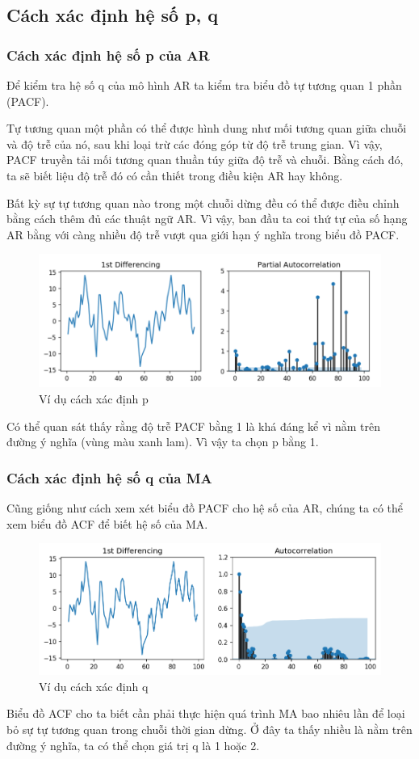  \subsection{Cách xác định hệ số p, q}
 \subsubsection{Cách xác định hệ số p của AR}
     Để kiểm tra hệ số q của mô hình AR ta kiểm tra biểu đồ tự tương quan 1 phần (PACF). \par
     Tự tương quan một phần có thể được hình dung như mối tương quan giữa chuỗi và độ trễ của nó, sau khi loại trừ các đóng góp từ độ trễ trung gian. Vì vậy, PACF truyền tải mối tương quan thuần túy giữa độ trễ và chuỗi. Bằng cách đó, ta sẽ biết liệu độ trễ đó có cần thiết trong điều kiện AR hay không.\par
     Bất kỳ sự tự tương quan nào trong một chuỗi dừng đều có thể được điều chỉnh bằng cách thêm đủ các thuật ngữ AR. Vì vậy, ban đầu ta coi thứ tự của số hạng AR bằng với càng nhiều độ trễ vượt qua giới hạn ý nghĩa trong biểu đồ PACF.\par
\begin{figure}[H]
    \centering
    \includegraphics[scale=0.8]{figures/PACF.png}
    \caption{Ví dụ cách xác định p}
\end{figure}     
     Có thể quan sát thấy rằng độ trễ PACF bằng 1 là khá đáng kể vì nằm trên đường ý nghĩa (vùng màu xanh lam). Vì vậy ta chọn p bằng 1.
\subsubsection{Cách xác định hệ số q của MA}
     Cũng giống như cách xem xét biểu đồ PACF cho hệ số của AR, chúng ta có thể xem biểu đồ ACF để biết hệ số của MA.\par
\begin{figure}[H]
    \centering
    \includegraphics[scale=0.45]{figures/ACF.png}
    \caption{Ví dụ cách xác định q}
\end{figure}
     Biểu đồ ACF cho ta biết cần phải thực hiện quá trình MA bao nhiêu lần để loại bỏ sự tự tương quan trong chuỗi thời gian dừng. Ở đây ta thấy nhiều là nằm trên đường ý nghĩa, ta có thể chọn giá trị q là 1 hoặc 2.
